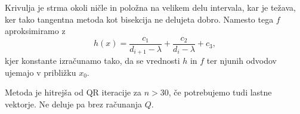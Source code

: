 Krivulja je strma okoli ničle in položna na velikem delu intervala, kar je
težava, ker tako tangentna metoda kot bisekcija ne delujeta dobro.
Namesto tega $f$ aproksimiramo z
\[
  h(x) = \frac{c_1}{d_{i+1} - \lambda} + \frac{c_2}{d_i - \lambda} + c_3,
\]
kjer konstante izračunamo tako, da se vrednosti $h$ in $f$ ter njunih odvodov
ujemajo v približku $x_0$.


Metoda je hitrejša od QR iteracije za $n > 30$, če potrebujemo tudi lastne
vektorje.
Ne deluje pa brez računanja $Q$.

